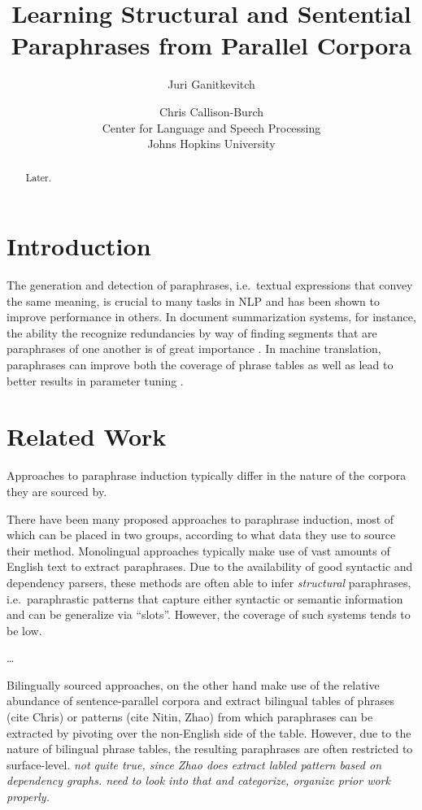 \documentclass[11pt]{article}
\title{Learning Structural and Sentential Paraphrases from Parallel Corpora}
\author{Juri Ganitkevitch \and Chris Callison-Burch\\ 
Center for Language and Speech Processing\\ 
Johns Hopkins University}
\date{}
\begin{document}
\maketitle

\begin{abstract}
Later.
\end{abstract}

\section{Introduction} \label{introduction}

The generation and detection of paraphrases, i.e.\ textual expressions
that convey the same meaning, is crucial to many tasks in NLP and has
been shown to improve performance in others. In document summarization
systems, for instance, the ability the recognize redundancies by way
of finding segments that are paraphrases of one another is of great
importance \cite{Barzilay1999}. In machine translation, paraphrases can improve both the
coverage of phrase tables \cite{Callison-Burch2006b} as well as lead
to better results in parameter tuning \cite{Madnani2007}.  

\section{Related Work} \label{related_work}

Approaches to paraphrase induction typically differ in the nature of
the corpora they are sourced by.

There have been many proposed approaches to paraphrase induction, most
of which can be placed in two groups, according to what data they use
to source their method. Monolingual approaches typically make use of
vast amounts of English text to extract paraphrases. Due to the
availability of good syntactic and dependency parsers, these methods
are often able to infer \emph{structural} paraphrases, i.e.\
paraphrastic patterns that capture either syntactic or semantic
information and can be generalize via ``slots''. However, the coverage
of such systems tends to be low.

\ldots

Bilingually sourced approaches, on the other hand make use of the
relative abundance of sentence-parallel corpora and extract bilingual
tables of phrases (cite Chris) or patterns (cite Nitin, Zhao) from
which paraphrases can be extracted by pivoting over the non-English
side of the table. However, due to the nature of bilingual phrase
tables, the resulting paraphrases are often restricted to
surface-level.
\emph{not quite true, since Zhao does extract labled pattern based on
  dependency graphs. need to look into that and categorize, organize
  prior work properly.}
\end{document}
